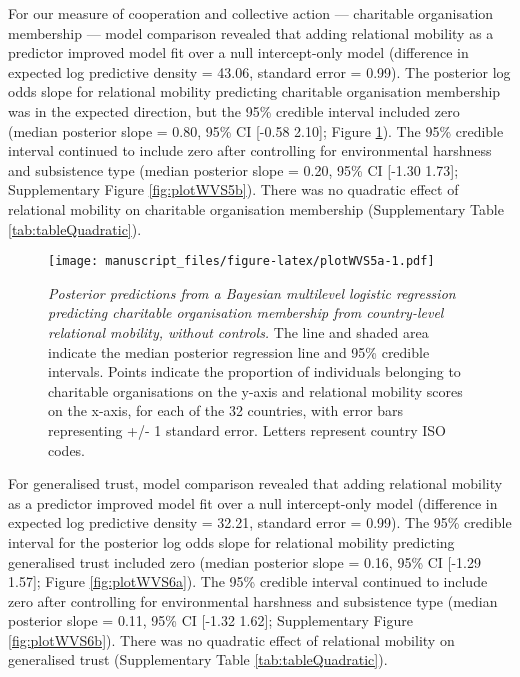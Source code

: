 \documentclass[
  man,floatsintext]{apa6}
\begin{document}
For our measure of cooperation and collective action --- charitable organisation membership --- model comparison revealed that adding relational mobility as a predictor improved model fit over a null intercept-only model (difference in expected log predictive density = 43.06, standard error = 0.99). The posterior log odds slope for relational mobility predicting charitable organisation membership was in the expected direction, but the 95\% credible interval included zero (median posterior slope = 0.80, 95\% CI {[}-0.58 2.10{]}; Figure \ref{fig:plotWVS5a}). The 95\% credible interval continued to include zero after controlling for environmental harshness and subsistence type (median posterior slope = 0.20, 95\% CI {[}-1.30 1.73{]}; Supplementary Figure \ref{fig:plotWVS5b}). There was no quadratic effect of relational mobility on charitable organisation membership (Supplementary Table \ref{tab:tableQuadratic}).



\begin{figure}
\centering
\texttt{[image: manuscript\_files/figure-latex/plotWVS5a-1.pdf]}
\caption{\label{fig:plotWVS5a}\emph{Posterior predictions from a Bayesian multilevel logistic regression predicting charitable organisation membership from country-level relational mobility, without controls.} The line and shaded area indicate the median posterior regression line and 95\% credible intervals. Points indicate the proportion of individuals belonging to charitable organisations on the y-axis and relational mobility scores on the x-axis, for each of the 32 countries, with error bars representing +/- 1 standard error. Letters represent country ISO codes.}
\end{figure}

For generalised trust, model comparison revealed that adding relational mobility as a predictor improved model fit over a null intercept-only model (difference in expected log predictive density = 32.21, standard error = 0.99). The 95\% credible interval for the posterior log odds slope for relational mobility predicting generalised trust included zero (median posterior slope = 0.16, 95\% CI {[}-1.29 1.57{]}; Figure \ref{fig:plotWVS6a}). The 95\% credible interval continued to include zero after controlling for environmental harshness and subsistence type (median posterior slope = 0.11, 95\% CI {[}-1.32 1.62{]}; Supplementary Figure \ref{fig:plotWVS6b}). There was no quadratic effect of relational mobility on generalised trust (Supplementary Table \ref{tab:tableQuadratic}).
\end{document}
